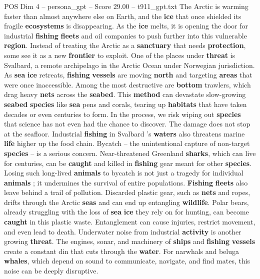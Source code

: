 \begin{textsample}{POS Dim 4 – persona\_gpt – Score 29.00 – t911\_gpt.txt}  \label{ex:f4_pos_024}
The Arctic is warming faster than almost anywhere else on Earth, and the \textbf{ice} that once shielded its fragile \textbf{ecosystems} is disappearing.
As the \textbf{ice} melts, it is opening the door for industrial \textbf{fishing} \textbf{fleets} and oil companies to push further into this vulnerable \textbf{region}.
Instead of treating the Arctic as a \textbf{sanctuary} that needs \textbf{protection}, some see it as a new \textbf{frontier} to exploit.
One of the places under \textbf{threat} is Svalbard, a remote archipelago in the Arctic Ocean under Norwegian jurisdiction.
As \textbf{sea} \textbf{ice} retreats, \textbf{fishing} \textbf{vessels} are moving \textbf{north} and targeting \textbf{areas} that were once inaccessible.
Among the most destructive are \textbf{bottom} trawlers, which drag heavy \textbf{nets} across the \textbf{seabed}.
This \textbf{method} can devastate slow-growing \textbf{seabed} \textbf{species} like \textbf{sea} pens and corals, tearing up \textbf{habitats} that have taken decades or even centuries to form.
In the process, we risk wiping out \textbf{species} that science has not even had the chance to discover.
The damage does not stop at the seafloor.
Industrial \textbf{fishing} in Svalbard ’s \textbf{waters} also threatens marine \textbf{life} higher up the food chain.
Bycatch – the unintentional capture of non-target \textbf{species} – is a serious concern.
Near-threatened Greenland \textbf{sharks}, which can live for centuries, can be \textbf{caught} and killed in \textbf{fishing} gear meant for other \textbf{species}.
Losing such long-lived \textbf{animals} to bycatch is not just a tragedy for individual \textbf{animals} ; it undermines the survival of entire populations. \textbf{Fishing} \textbf{fleets} also leave behind a trail of pollution.
Discarded plastic gear, such as \textbf{nets} and ropes, drifts through the Arctic \textbf{seas} and can end up entangling \textbf{wildlife}.
Polar bears, already struggling with the loss of \textbf{sea} \textbf{ice} they rely on for hunting, can become \textbf{caught} in this plastic waste.
Entanglement can cause injuries, restrict movement, and even lead to death.
Underwater noise from industrial \textbf{activity} is another growing \textbf{threat}.
The engines, sonar, and machinery of \textbf{ships} and \textbf{fishing} \textbf{vessels} create a constant din that cuts through the \textbf{water}.
For narwhals and beluga \textbf{whales}, which depend on sound to communicate, navigate, and find mates, this noise can be deeply disruptive.

\end{textsample}
